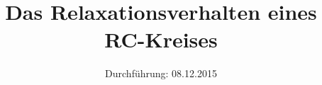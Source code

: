 

\subject{Versuchsprotokoll zum Versuch Nr. 353}
\title{Das Relaxationsverhalten eines RC-Kreises}
\date{
  Durchführung: 08.12.2015
}



\maketitle
\newpage






\printbibliography


